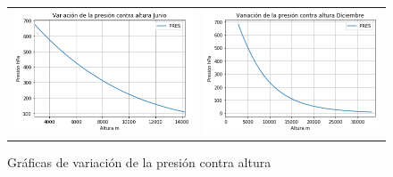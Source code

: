 \documentclass[a4paper]{article}
\begin{document}
\begin{figure}[h]
\begin{tabular}{ll}
\includegraphics[scale=0.5]{grafica1.png}
&
\includegraphics[scale=0.5]{grafica2.png}
\end{tabular}
\caption{Gráficas de variación de la presión contra altura}

\end{figure}
\end{document}
